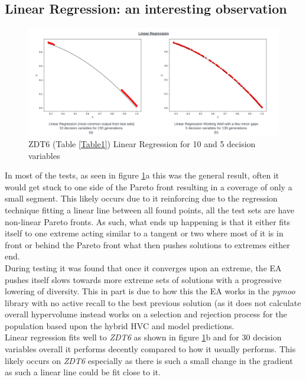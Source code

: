 \documentclass[sigconf,review,nonacm]{acmart}
\begin{document}
\subsection{Linear Regression: an interesting observation}

\begin{figure}[H]
    \centering
    \includegraphics[width=1\linewidth]{Images/LinearRegression.png}
    \caption{ZDT6 (Table \ref{Table1}) Linear Regression for 10 and 5 decision variables}
    \label{fig:linear-regression-two}
\end{figure}

\noindent In most of the tests, as seen in figure \ref{fig:linear-regression-two}a this was the general result, often it would get stuck to one side of the Pareto front resulting in a coverage of only a small segment. This likely occurs due to it reinforcing due to the regression technique fitting a linear line between all found points, all the test sets are have non-linear Pareto fronts. As such, what ends up happening is that it either fits itself to one extreme acting similar to a tangent or two where most of it is in front or behind the Pareto front what then pushes solutions to extremes either end. \\

\noindent During testing it was found that once it converges upon an extreme, the EA pushes itself slows towards more extreme sets of solutions with a progressive lowering of diversity. This in part is due to how this the EA works in the \textit{pymoo} library with no active recall to the best previous solution (as it does not calculate overall hypervolume instead works on a selection and rejection process for the population based upon the hybrid HVC and model predictions. \\

\noindent Linear regression fits well to \textit{ZDT6} as shown in figure \ref{fig:linear-regression-two}b and for 30 decision variables overall it performs decently compared to how it usually performs. This likely occurs on \textit{ZDT6} especially as there is such a small change in the gradient as such a linear line could be fit close to it. 
\end{document}
